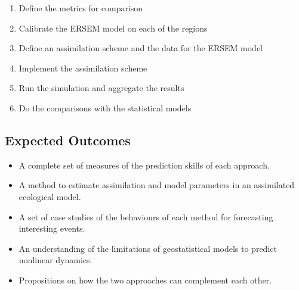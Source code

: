\begin{enumerate}
\item Define the metrics for comparison
\item Calibrate the ERSEM model on each of the regions
\item Define an assimilation scheme and the data for the ERSEM model
\item Implement the assimilation scheme
\item Run the simulation and aggregate the results
\item Do the comparisons with the statistical models
\end{enumerate}

\subsection{Expected Outcomes}

\begin{itemize}
\item A complete set of measures of the prediction skills of each approach.
\item A method to estimate assimilation and model parameters in an assimilated ecological model.
\item A set of case studies of the behaviours of each method for forecasting interesting events.
\item An understanding of the limitations of geostatistical models to predict nonlinear dynamics. 
\item Propositions on how the two approaches can complement each other.
\end{itemize}

